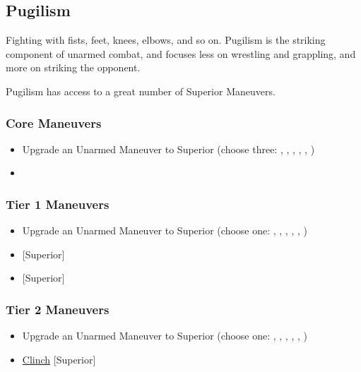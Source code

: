 \documentclass[oneside,11pt,english]{book}
\begin{document}
\subsection{Pugilism}
Fighting with fists, feet, knees, elbows, and so on. Pugilism is the striking component of unarmed combat, and focuses less on wrestling and grappling, and more on striking the opponent. 

Pugilism has access to a great number of Superior Maneuvers. 

\subsubsection{Core Maneuvers}
\vspace{-5pt}\begin{itemize}
	[itemsep=0.5mm]
	\item Upgrade an Unarmed Maneuver to Superior (choose three: , , , , , )
	\item {}
\end{itemize}

\subsubsection{Tier 1 Maneuvers}
\vspace{-5pt} \begin{itemize}
	[itemsep=0.5mm]
	\item Upgrade an Unarmed Maneuver to Superior (choose one: , , , , , )
	\item {} [Superior]
	\item {} [Superior]
\end{itemize}
\subsubsection{Tier 2 Maneuvers}
\vspace{-5pt}\begin{itemize}
	[itemsep=0.5mm]
	\item Upgrade an Unarmed Maneuver to Superior (choose one: , , , , , )
	\item \hyperref[man:Clinch (Attack)]{Clinch} [Superior]
\end{itemize}
\end{document}

